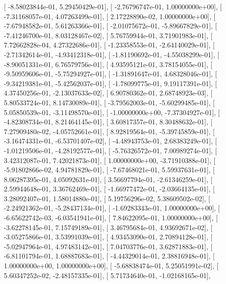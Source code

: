 \documentclass{article}
\begin{document}
       [ -8.58023844e-01,   5.29450429e-01],
       [ -2.76796747e-01,   1.00000000e+00],
       [ -7.31168057e-01,   4.07263499e-01],
       [  2.17228890e-02,   1.00000000e+00],
       [ -7.67948582e-01,   5.61263366e-01],
       [ -2.01075672e-01,  -5.89667829e-01],
       [ -7.41246700e-01,   8.03128467e-02],
       [  5.76759944e-01,   3.71901983e-01],
       [  7.72662828e-04,   4.27322686e-01],
       [ -1.23358553e-01,  -2.64140029e-01],
       [ -2.71342614e-01,  -4.93412318e-01],
       [ -1.81190692e-01,  -4.55038299e-01],
       [ -8.90051331e-01,   6.76579756e-01],
       [  4.93595121e-01,   3.78154055e-01],
       [ -9.50959606e-01,  -5.75294927e-01],
       [ -1.31891647e-01,   4.68328046e-01],
       [ -9.34219381e-01,  -5.42562037e-01],
       [ -1.78099775e-01,   9.19117391e-01],
       [  4.37450256e-01,  -2.13037633e-02],
       [  6.90780362e-01,   2.68748923e-03],
       [  5.80533724e-01,   8.14730089e-01],
       [ -3.79562003e-01,  -5.60299485e-01],
       [  5.05850539e-01,  -3.11498570e-01],
       [ -1.00000000e+00,  -7.37304927e-01],
       [ -4.82308734e-01,   8.21464145e-01],
       [  3.60817357e-01,   8.30488632e-01],
       [  7.27909480e-02,  -4.05752661e-01],
       [  8.92819564e-01,  -5.39745859e-01],
       [ -3.16474331e-01,  -6.53701407e-02],
       [ -4.48943753e-01,   2.68383249e-01],
       [ -1.01219506e-01,  -4.28192577e-01],
       [ -5.76326572e-01,   7.00989274e-01],
       [  3.42312087e-01,   7.42021873e-01],
       [  1.00000000e+00,  -3.71910388e-01],
       [ -5.91802866e-02,   4.94781829e-01],
       [ -7.67468021e-01,   5.59937631e-01],
       [  8.06287395e-01,   4.05092631e-01],
       [  3.56697794e-01,  -2.61346259e-01],
       [  2.59944648e-01,   3.36762469e-01],
       [ -1.66977472e-01,  -2.03664135e-01],
       [  3.28092407e-01,   1.58014880e-01],
       [  5.19756296e-02,   5.38609502e-02],
       [ -2.24921362e-01,  -5.28437134e-01],
       [ -1.69283343e-01,   1.00000000e+00],
       [ -6.65622742e-03,  -6.03541941e-01],
       [  7.84622095e-01,   1.00000000e+00],
       [ -3.62278145e-01,   7.15749189e-01],
       [  3.46795684e-01,   4.93692671e-02],
       [ -3.05275866e-01,   3.53991039e-01],
       [  4.93453090e-01,   2.70894128e-01],
       [ -5.02947964e-01,   4.97483142e-01],
       [  7.04703776e-01,   3.62871883e-01],
       [ -6.81101794e-01,   1.68887683e-01],
       [ -4.44329014e-01,   2.38816948e-01],
       [  1.00000000e+00,   1.00000000e+00],
       [ -5.68838474e-01,   5.25051991e-02],
       [  5.60347252e-02,  -2.48157335e-01],
       [  5.71734640e-01,  -1.02168165e-01],
\end{document}

